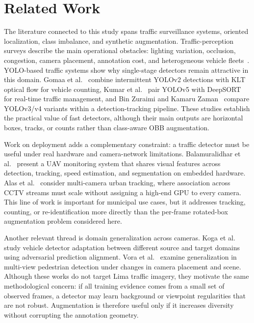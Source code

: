 \section{Related Work}
\label{sec:related_work}

The literature connected to this study spans traffic surveillance systems, oriented localization, class imbalance, and synthetic augmentation. Traffic-perception surveys describe the main operational obstacles: lighting variation, occlusion, congestion, camera placement, annotation cost, and heterogeneous vehicle fleets~\cite{Zhou2025TrafficSurveillanceSurvey,Azfar2024ComplexTrafficReview}. YOLO-based traffic systems show why single-stage detectors remain attractive in this domain. Gomaa et al.~\cite{Gomaa2022} combine intermittent YOLOv2 detections with KLT optical flow for vehicle counting, Kumar et al.~\cite{Kumar2023} pair YOLOv5 with DeepSORT for real-time traffic management, and Bin Zuraimi and Kamaru Zaman~\cite{BinZuraimi2021} compare YOLOv3/v4 variants within a detection-tracking pipeline. These studies establish the practical value of fast detectors, although their main outputs are horizontal boxes, tracks, or counts rather than class-aware OBB augmentation.

Work on deployment adds a complementary constraint: a traffic detector must be useful under real hardware and camera-network limitations. Balamuralidhar et al.~\cite{Balamuralidhar2021} present a UAV monitoring system that shares visual features across detection, tracking, speed estimation, and segmentation on embedded hardware. Alas et al.~\cite{Alas2026} consider multi-camera urban tracking, where association across CCTV streams must scale without assigning a high-end GPU to every camera. This line of work is important for municipal use cases, but it addresses tracking, counting, or re-identification more directly than the per-frame rotated-box augmentation problem considered here.

Another relevant thread is domain generalization across cameras. Koga et al.~\cite{Koga2021VehicleDomainAdaptation} study vehicle detector adaptation between different source and target domains using adversarial prediction alignment. Vora et al.~\cite{Vora2023GeneralizationMultiview} examine generalization in multi-view pedestrian detection under changes in camera placement and scene. Although these works do not target Lima traffic imagery, they motivate the same methodological concern: if all training evidence comes from a small set of observed frames, a detector may learn background or viewpoint regularities that are not robust. Augmentation is therefore useful only if it increases diversity without corrupting the annotation geometry.

